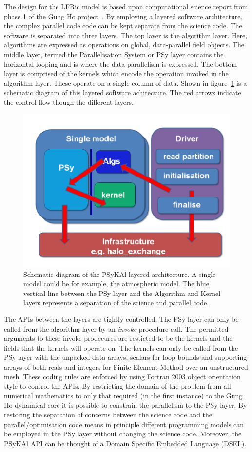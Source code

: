 \documentclass[times]{elsarticle}
\begin{document}
The design for the LFRic model is based upon computational science
report from phase 1 of the Gung Ho project~\cite{GHP1_CSR}. By
employing a layered software architecture, the complex parallel code
code can be kept separate from the science code. The software is
separated into three layers. The top layer is the algorithm
layer. Here, algorithms are expressed as operations on global,
data-parallel field objects. The middle layer, termed the
Parallelisation System or PSy layer contains the horizontal looping
and is where the data parallelism is expressed.  The bottom layer is
comprised of the kernels which encode the operation invoked in the
algorithm layer. These operate on a single column of data. 
Shown in figure~\ref{fig:psykal} is a schematic diagram of this
layered software achitecture. The red arrows indicate the control flow
though the different layers. 

\begin{figure}
\centering\includegraphics[width=0.8\linewidth]{PSyKAl.pdf}
\caption{\label{fig:psykal} Schematic diagram of the PSyKAl layered
  architecture. A single model could be for example, the atmospheric
  model. The blue vertical line between the PSy layer and the
  Algorithm and Kernel layers represents a separation of the science
  and parallel code.}
\end{figure}

The APIs between the layers are tightly controlled. The PSy layer can
only be called from the algorithm layer by an {\em invoke} procedure
call. The permitted arguments to these invoke prodecures are resticted
to be the kernels and the fields that the kernels will operate on. The
kernels can only be called from the PSy layer with the unpacked data
arrays, scalars for loop bounds and supporting arrays of both reals
and integers for Finite Element Method over an unstructured mesh.
These coding rules are enforced by using Fortran 2003 object
orientation style to control the APIs. By restricting the domain of
the problem from all numerical mathematics to only that required (in
the first instance) to the Gung Ho dynamical core it is possible to
constrain the parallelism to the PSy layer. By restoring the
separation of concerns between the science code and the
parallel/optimisation code means in principle different programming
models can be employed in the PSy layer without changing the science
code. Moreover, the PSyKAl API can be thought of a Domain Specific
Embedded Language (DSEL).
\end{document}
